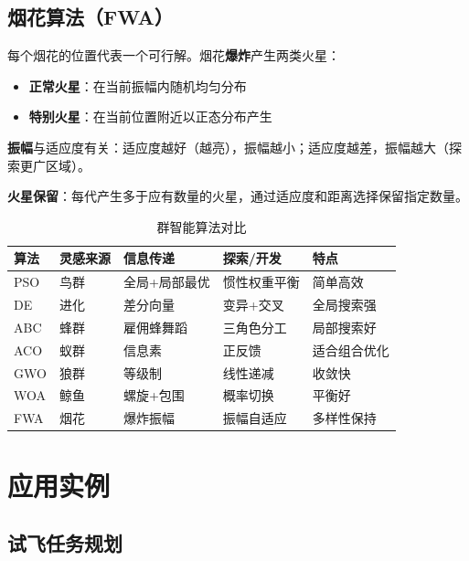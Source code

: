 \subsection{烟花算法（FWA）}

\begin{conceptbox}[FWA原理]
每个烟花的位置代表一个可行解。烟花\textbf{爆炸}产生两类火星：
\begin{itemize}[itemsep=0.3em]
    \item \textbf{正常火星}：在当前振幅内随机均匀分布
    \item \textbf{特别火星}：在当前位置附近以正态分布产生
\end{itemize}

\textbf{振幅}与适应度有关：适应度越好（越亮），振幅越小；适应度越差，振幅越大（探索更广区域）。

\textbf{火星保留}：每代产生多于应有数量的火星，通过适应度和距离选择保留指定数量。
\end{conceptbox}

\begin{table}[htbp]
\centering
\caption{群智能算法对比}
\begin{tabular}{@{}lllll@{}}
\toprule
\textbf{算法} & \textbf{灵感来源} & \textbf{信息传递} & \textbf{探索/开发} & \textbf{特点} \\
\midrule
PSO & 鸟群 & 全局+局部最优 & 惯性权重平衡 & 简单高效 \\
DE & 进化 & 差分向量 & 变异+交叉 & 全局搜索强 \\
ABC & 蜂群 & 雇佣蜂舞蹈 & 三角色分工 & 局部搜索好 \\
ACO & 蚁群 & 信息素 & 正反馈 & 适合组合优化 \\
GWO & 狼群 & 等级制 & 线性递减 & 收敛快 \\
WOA & 鲸鱼 & 螺旋+包围 & 概率切换 & 平衡好 \\
FWA & 烟花 & 爆炸振幅 & 振幅自适应 & 多样性保持 \\
\bottomrule
\end{tabular}
\end{table}

\section{应用实例}\label{sec:applications}

\subsection{试飞任务规划}

